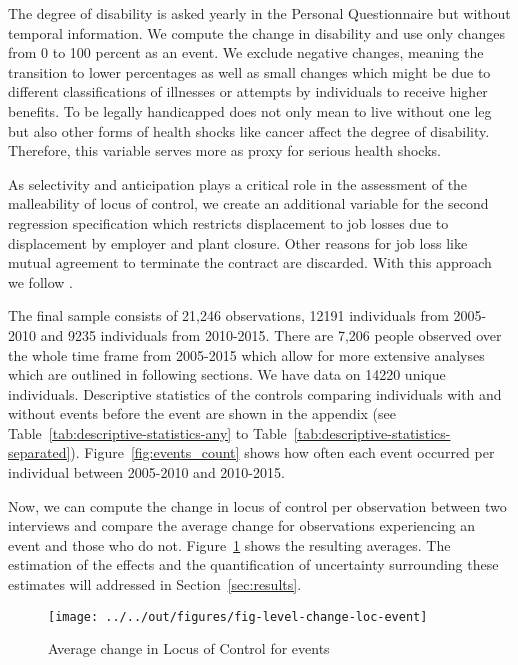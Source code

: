 \documentclass[12pt, a4paper, fleqn, parskip]{scrartcl}
\begin{document}
The degree of disability is asked yearly in the Personal Questionnaire but
without temporal information. We compute the change in disability and use only
changes from 0 to 100 percent as an event. We exclude negative changes, meaning
the transition to lower percentages as well as small changes which might be due
to different classifications of illnesses or attempts by individuals to receive
higher benefits. To be legally handicapped does not only mean to live without
one leg but also other forms of health shocks like cancer affect the degree of
disability. Therefore, this variable serves more as proxy for serious health
shocks.

As selectivity and anticipation plays a critical role in the assessment of the
malleability of locus of control, we create an additional variable for the
second regression specification which restricts displacement to job losses due
to displacement by employer and plant closure. Other reasons for job loss like
mutual agreement to terminate the contract are discarded. With this approach we
follow \citet{preuss2017}.

The final sample consists of 21,246 observations, 12191 individuals from
2005-2010 and 9235 individuals from 2010-2015. There are 7,206 people observed
over the whole time frame from 2005-2015 which allow for more extensive
analyses which are outlined in following sections. We have data on 14220 unique
individuals. Descriptive statistics of the controls comparing individuals with
and without events before the event are shown in the appendix (see
Table~\ref{tab:descriptive-statistics-any} to
Table~\ref{tab:descriptive-statistics-separated}).
Figure~\ref{fig:events_count} shows how often each event occurred per
individual between 2005-2010 and 2010-2015.

Now, we can compute the change in locus of control per observation between two
interviews and compare the average change for observations experiencing an
event and those who do not. Figure~\ref{fig:level-change-loc-event} shows the
resulting averages. The estimation of the effects and the quantification of
uncertainty surrounding these estimates will addressed in
Section~\ref{sec:results}.

\begin{figure}[H]
    \centering
    \texttt{[image: ../../out/figures/fig-level-change-loc-event]}
    \caption{Average change in Locus of Control for events}
    \label{fig:level-change-loc-event}
\end{figure}
\end{document}
